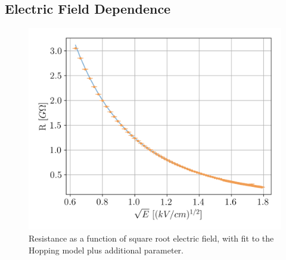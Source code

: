 \documentclass[a4paper,12pt]{article}
\begin{document}

\subsection{Electric Field Dependence}
\label{sec:efield_dep}
\begin{figure}
\begin{center}
	\includegraphics[width=.75\linewidth]{Efield.png}
	\caption{Resistance as a function of square root electric field, with fit to the Hopping model plus additional parameter.}
	\label{fig:resvsvol}
\end{center}
\end{figure}

\end{document}
